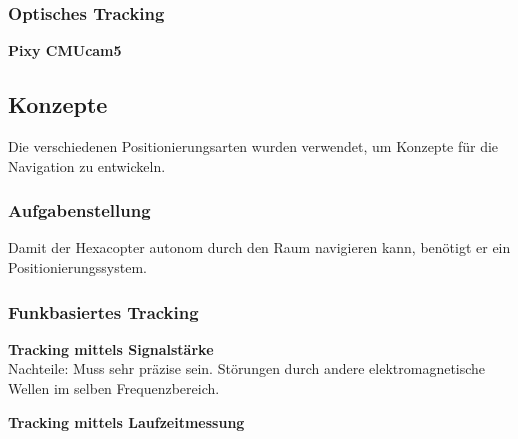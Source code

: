     \subsubsection{Optisches Tracking}

    \textbf{Pixy CMUcam5}\\




  \subsection{Konzepte}
  Die verschiedenen Positionierungsarten wurden verwendet, um Konzepte für die Navigation zu entwickeln.

    \subsubsection{Aufgabenstellung}
    Damit der Hexacopter autonom durch den Raum navigieren kann, benötigt er ein Positionierungssystem.

    \subsubsection{Funkbasiertes Tracking}

      \textbf{Tracking mittels Signalstärke}\\


      Nachteile:
      Muss sehr präzise sein.
      Störungen durch andere elektromagnetische Wellen im selben Frequenzbereich.



      \textbf{Tracking mittels Laufzeitmessung}\\





